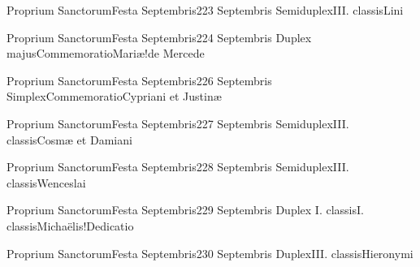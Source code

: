 \documentclass[liber-responsorialis.tex]{subfiles}
\begin{document}
	{Proprium Sanctorum}{Festa Septembris}{2}{23 Septembris}
	{Semiduplex}{III. classis}{Lini}
	{\umexrubric}
	{\respdetemp}

	{Proprium Sanctorum}{Festa Septembris}{2}{24 Septembris}
	{Duplex majus}{Commemoratio}{Mariæ!de Mercede}
	{\cbmvrubric}
	{\respdetemp}

	{Proprium Sanctorum}{Festa Septembris}{2}{26 Septembris}
	{Simplex}{Commemoratio}{Cypriani et Justinæ}
	{}
	{}
\rubric{\respdetemp}

	{Proprium Sanctorum}{Festa Septembris}{2}{27 Septembris}
	{Semiduplex}{III. classis}{Cosmæ et Damiani}
	{\pmexrubric}
	{\respdetemp}

	{Proprium Sanctorum}{Festa Septembris}{2}{28 Septembris}
	{Semiduplex}{III. classis}{Wenceslai}
	{\umexrubric}
	{\respdetemp}

	{Proprium Sanctorum}{Festa Septembris}{2}{29 Septembris}
	{Duplex I. classis}{I. classis}{Michaëlis!Dedicatio}
	{}
	{}

	{Proprium Sanctorum}{Festa Septembris}{2}{30 Septembris}
	{Duplex}{III. classis}{Hieronymi}
	{\conpdorubric}
	{\respdetemp}
\end{document}
